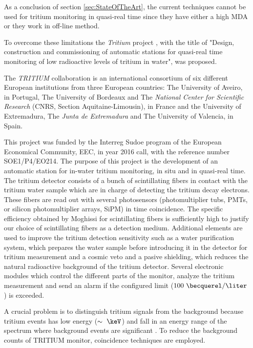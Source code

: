 As a conclusion of section \ref{sec:StateOfTheArt}, the current techniques cannot be used for tritium monitoring in quasi-real time since they have either a high MDA or they work in off-line method. 

To overcome these limitations the \textit{Tritium} project \cite{TRITIUM}, with the title of "Design, construction and commissioning of automatic stations for quasi-real time monitoring of low radioactive levels of tritium in water", was proposed.

The \textit{TRITIUM} collaboration is an international consortium of six different European institutions from three European countries: The University of Aveiro, in Portugal, The University of Bordeaux and The \textit{National Center for Scientific Research} (CNRS, Section Aquitaine-Limousin), in France and the University of Extremadura, The \textit{Junta de Extremadura} and The University of Valencia, in Spain.

This project was funded by the Interreg Sudoe program of the European Economical Community, EEC, in year 2016 call, with the reference number SOE1/P4/EO214. The purpose of this project is the development of an automatic station for in-water tritium monitoring, in situ and in quasi-real time. The tritium detector consists of a bunch of scintillating fibers in contact with the tritium water sample which are in charge of detecting the tritium decay electrons. These fibers are read out with several photosensors (photomultiplier tubs, PMTs, or silicon photomultiplier arrays, SiPM) in time coincidence. The specific efficiency obtained by Moghissi for scintillating fibers is sufficiently high to justify our choice of scintillating fibers as a detection medium. Additional elements are used to improve the tritium detection sensitivity such as a water purification system, which prepares the water sample before introducing it in the detector for tritium measurement and a cosmic veto and a pasive shielding, which reduces the natural radioactive background of the tritium detector. Several electronic modules which control the different parts of the monitor, analyze the tritium measurement and send an alarm if the configured limit ($100~\becquerel/\liter$) is exceeded.

A crucial problem is to distinguish tritium signals from the background because tritium events has low energy ($\sim~\keV$) and fall in an energy range of the spectrum where background events are significant . To reduce the background counts of TRITIUM monitor, coincidence techniques are employed.

